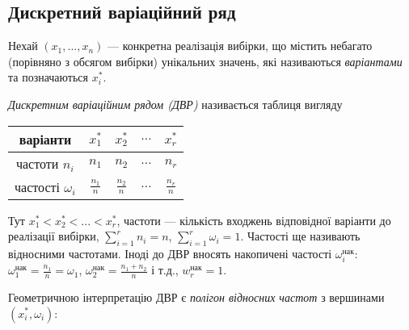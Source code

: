 \subsection{Дискретний варіаційний ряд}
Нехай $\left(x_1, ... ,x_n\right)$ --- конкретна реалізація вибірки, що містить небагато (порівняно з обсягом вибірки) унікальних значень,
які називаються \emph{варіантами} та позначаються $x_i^*$.
\begin{definition}
    \emph{Дискретним варіаційним рядом (ДВР)} називається таблиця вигляду
    \begin{center}
    \begin{tabular}{|c|c|c|c|c|}
        \hline
        варіанти & $x_1^*$ & $x_2^*$ & $...$ & $x_r^*$ \\
        \hline
        частоти $n_i$ & $n_1$ & $n_2$ & $...$ & $n_r$ \\
        \hline
        частості $\omega_i $& $\frac{n_1}{n}$ & $\frac{n_2}{n}$ & $...$ & $\frac{n_r}{n}$ \\
        \hline
    \end{tabular}
    \end{center}
    Тут $x_1^* < x_2^* < ... < x_r^*$, частоти --- кількість входжень відповідної варіанти до реалізації вибірки, $\sum\limits_{i=1}^r n_i = n$, $\sum\limits_{i=1}^r \omega_i = 1$.
    Частості ще називають відносними частотами.
    Іноді до ДВР вносять накопичені частості $\omega_i^{\text{нак}}$: $\omega_1^{\text{нак}} = \frac{n_1}{n} = \omega_1$, $\omega_2^{\text{нак}} = \frac{n_1+n_2}{n}$ і т.д., $w_r^{\text{нак}} = 1$.
\end{definition}
Геометричною інтерпретацію ДВР є \emph{полігон відносних частот} з вершинами $\left( x_i^*, \omega_i\right)$:
